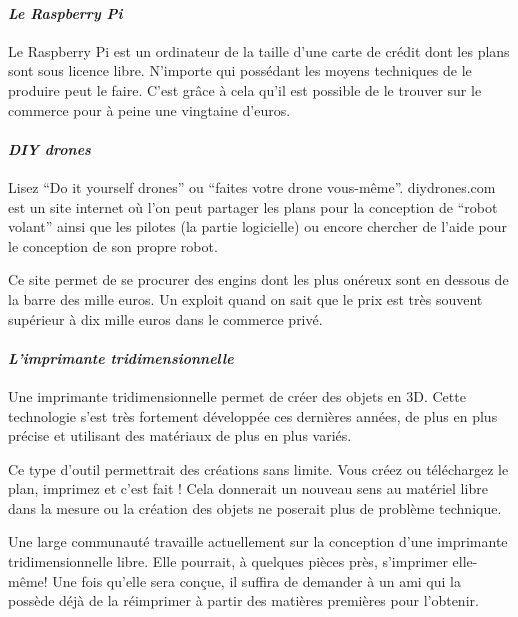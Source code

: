 \documentclass[12pt]{../fiche}
\begin{document}
\paragraph{\textit{Le Raspberry Pi}}
Le Raspberry Pi est un ordinateur de la taille d'une carte de crédit dont les plans sont sous licence libre. N'importe qui possédant les moyens techniques de le produire peut le faire. C'est grâce à cela qu'il est possible de le trouver sur le commerce pour à peine une vingtaine d'euros.

\paragraph{\textit{DIY drones}}
Lisez ``Do it yourself drones'' ou ``faites votre drone vous-même''. diydrones.com est un site internet où l'on peut partager les plans pour la conception de ``robot volant'' ainsi que les pilotes (la partie logicielle) ou encore chercher de l'aide pour le conception de son propre robot.

Ce site permet de se procurer des engins dont les plus onéreux sont en dessous de la barre des mille euros. Un exploit quand on sait que le prix est très souvent supérieur à dix mille euros dans le commerce privé.

\paragraph{\textit{L'imprimante tridimensionnelle}}
Une imprimante tridimensionnelle permet de créer des objets en 3D. Cette technologie s'est très fortement développée ces dernières années, de plus en plus précise et utilisant des matériaux de plus en plus variés.

Ce type d'outil permettrait des créations sans limite. Vous créez ou téléchargez le plan, imprimez et c'est fait ! Cela donnerait un nouveau sens au matériel libre dans la mesure ou la création des objets ne poserait plus de problème technique.

Une large communauté travaille actuellement sur la conception d'une imprimante tridimensionnelle libre. Elle pourrait, à quelques pièces près, s'imprimer elle-même! Une fois qu'elle sera conçue, il suffira de demander à un ami qui la possède déjà de la réimprimer à partir des matières premières pour l'obtenir.
\end{document}

